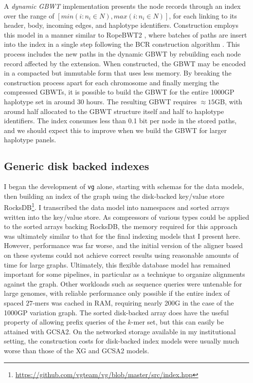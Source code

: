 A \emph{dynamic GBWT} implementation presents the node records through an index over the range of $[min(i : n_i \in N), max(i : n_i \in N)]$, for each linking to its header, body, incoming edges, and haplotype identifiers.
Construction employs this model in a manner similar to RopeBWT2 \cite{li2014fast}, where batches of paths are insert into the index in a single step following the BCR construction algorithm \cite{bauer2013lightweight}.
This process includes the new paths in the dynamic GBWT by rebuilding each node record affected by the extension.
When constructed, the GBWT may be encoded in a compacted but immutable form that uses less memory.
By breaking the construction process apart for each chromosome and finally merging the compressed GBWTs, it is possible to build the GBWT for the entire 1000GP haplotype set in around 30 hours.
The resulting GBWT requires $\approx 15$GB, with around half allocated to the GBWT structure itself and half to haplotype identifiers.
The index consumes less than 0.1 bit per node in the stored paths, and we should expect this to improve when we build the GBWT for larger haplotype panels.

\subsection{Generic disk backed indexes}
\label{sec:generic_disk_backed_indexes}
I began the development of {\tt vg} alone, starting with schemas for the data models, then building an index of the graph using the disk-backed key/value store RocksDB\footnote{\url{https://github.com/vgteam/vg/blob/master/src/index.hpp}}.
I transcribed the data model into namespaces and sorted arrays written into the key/value store.
As compressors of various types could be applied to the sorted arrays backing RocksDB, the memory required for this approach was ultimately similar to that for the final indexing models that I present here.
However, performance was far worse, and the initial version of the aligner based on these systems could not achieve correct results using reasonable amounts of time for large graphs.
Ultimately, this flexible database model has remained important for some pipelines, in particular as a technique to organize alignments against the graph.
Other workloads such as sequence queries were untenable for large genomes, with reliable performance only possible if the entire index of spaced $27$-mers was cached in RAM, requiring nearly 200G in the case of the 1000GP variation graph.
The sorted disk-backed array does have the useful property of allowing prefix queries of the $k$-mer set, but this can easily be attained with GCSA2.
On the networked storage available in my institutional setting, the construction costs for disk-backed index models were usually much worse than those of the XG and GCSA2 models.

